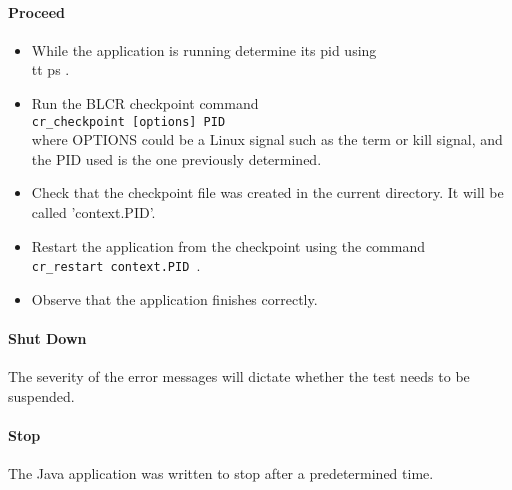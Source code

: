 \paragraph{Proceed}
\begin{itemize}
\item While the application is running determine its pid using {\\tt ps }.
\item Run the BLCR checkpoint command\\
	{\tt cr\_checkpoint [options] PID}\\
	where OPTIONS could be a Linux signal such as the term or kill signal, and the PID used is the one previously determined.
\item Check that the checkpoint file was created in the current directory. It will be called 'context.PID'.
\item Restart the application from the checkpoint using the command\\
	{\tt cr\_restart context.PID }.
\item Observe that the application finishes correctly.
\end{itemize}


\paragraph{Shut Down}
The severity of the error messages will dictate whether the test needs to be suspended.


\paragraph{Stop}
The Java application was written to stop after a predetermined time.


